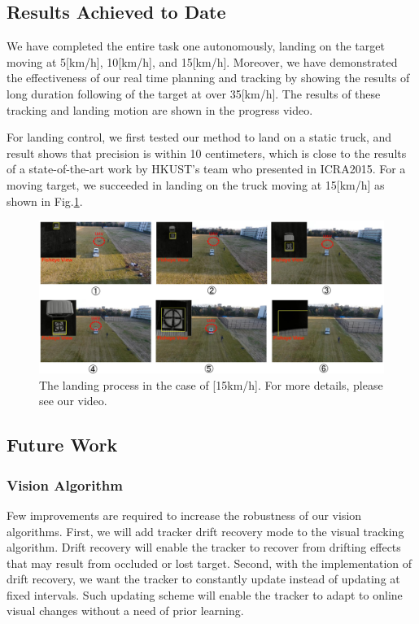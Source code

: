 \documentclass{standalone}
\begin{document}
\subsection{Results Achieved to Date}

We have completed the entire task one autonomously, landing on the 
target moving at 5[km/h], 10[km/h], and 15[km/h]. Moreover, we have demonstrated the effectiveness of our real time planning and tracking by showing the results of long duration
following of the target at over 35[km/h]. The results of these tracking and landing motion are shown in the progress video.

For landing control, we first tested our method to land on a static truck, and result shows that precision is within 10 centimeters, which is close to the results of a state-of-the-art work by HKUST's team who presented in ICRA2015. For a moving target, we succeeded in landing on the truck moving at 15[km/h] as shown in Fig.\ref{figure:landing}.

\begin{figure}[h]
    \begin{center}
      \includegraphics[clip, bb= 0 0 720 315, width=1.0\columnwidth]{sections/task1/images/task1_landing.eps}
    \end{center}
    \caption{The landing process in the case of [15km/h]. For more details, please see our video.}
    \label{figure:landing}
\end{figure}


\subsection{Future Work}
\subsubsection{Vision Algorithm}
Few improvements are required to increase the robustness of our
vision algorithms. First, we will add tracker drift recovery mode to
the visual tracking algorithm. Drift recovery will enable the
tracker to recover from drifting effects that may result from
occluded or lost target. Second, with the implementation of drift
recovery, we want the tracker to constantly update instead of updating at fixed
intervals. Such updating scheme will enable the tracker to adapt to
online visual changes without a need of prior learning.
\end{document}
